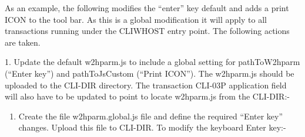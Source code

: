 \documentclass[letterpaper,10pt,english]{sphinxmanual}
\begin{document}
As an example, the following modifies the “enter” key default and adds a print ICON to the tool bar. As this is a global modification it will apply to all transactions running under the CLIWHOST entry point. The following actions are taken.

1. Update the default w2hparm.js to include a global setting for pathToW2hparm (“Enter key”) and pathToJsCustom (“Print ICON”). The w2hparm.js should be uploaded to the CLI-DIR directory. The transaction CLI-03P application field will also have to be updated to point to locate w2hparm.js from the CLI-DIR:-

\begin{sphinxVerbatim}[commandchars=\\\{\}]
   
\end{sphinxVerbatim}
\begin{enumerate}
\def\theenumi{\arabic{enumi}}
\def\labelenumi{\theenumi .}
\makeatletter\def\p@enumii{\p@enumi \theenumi .}\makeatother
\setcounter{enumi}{1}
\item {} 
Create the file w2hparm.global.js file and define the required “Enter key” changes. Upload this file to CLI-DIR. To modify the keyboard Enter key:-

\end{enumerate}
\end{document}
